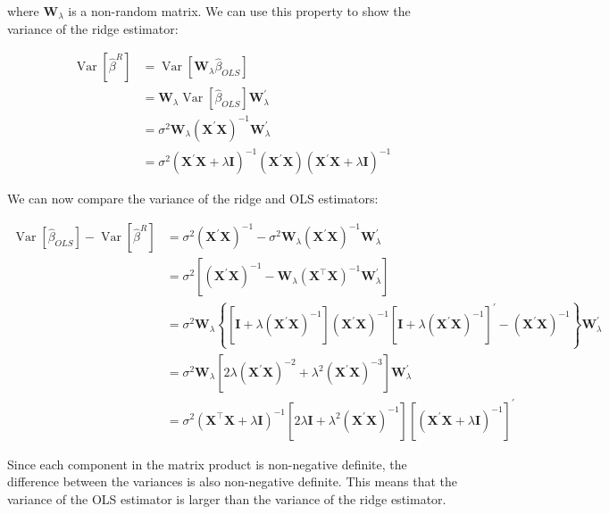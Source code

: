 \noindent where $\mathbf{W}_{\lambda}$ is a non-random matrix. We can use this property to show the variance of the ridge estimator:

\begin{align*}
\operatorname{Var}\left[\hat{\beta}^{R}\right]&=\operatorname{Var}\left[\mathbf{W}_\lambda\hat{\beta}_{OLS}\right]\\
&=\mathbf{W}_{\lambda}\operatorname{Var}\left[\hat{\beta}_{OLS}\right]\mathbf{W}_{\lambda}^{\prime}\\
&=\sigma^2 \mathbf{W}_\lambda (\mathbf{X}^{\prime} \mathbf{X})^{-1}\mathbf{W}_{\lambda}^{\prime}\\
&=\sigma^2\left(\mathbf{X}^{\prime} \mathbf{X}+\lambda \mathbf{I}\right)^{-1}(\mathbf{X}^{\prime} \mathbf{X})\left(\mathbf{X}^{\prime} \mathbf{X}+\lambda \mathbf{I}\right)^{-1}
\end{align*}

\noindent We can now compare the variance of the ridge and OLS estimators:

\begin{align*}
\operatorname{Var}[\hat{\beta}_{OLS}]-\operatorname{Var}[\hat{\beta}^{R}] &= \sigma^{2}(\mathbf{X}^{\prime} \mathbf{X})^{-1} - \sigma^2 \mathbf{W}_\lambda (\mathbf{X}^{\prime}\mathbf{X})^{-1}\mathbf{W}_{\lambda}^{\prime}\\
&=\sigma^{2}\left[\left(\mathbf{X}^{\prime} \mathbf{X}\right)^{-1}-\mathbf{W}_{\lambda}\left(\mathbf{X}^{\top} \mathbf{X}\right)^{-1} \mathbf{W}_{\lambda}^{\prime}\right] \\
&=\sigma^{2} \mathbf{W}_{\lambda}\left\{\left[\mathbf{I}+\lambda\left(\mathbf{X}^{\prime} \mathbf{X}\right)^{-1}\right]\left(\mathbf{X}^{\prime} \mathbf{X}\right)^{-1}\left[\mathbf{I}+\lambda\left(\mathbf{X}^{\prime} \mathbf{X}\right)^{-1}\right]^{\prime}-\left(\mathbf{X}^{\prime} \mathbf{X}\right)^{-1}\right\} \mathbf{W}_{\lambda}^{\prime} \\
&=\sigma^{2} \mathbf{W}_{\lambda}\left[2 \lambda\left(\mathbf{X}^{\prime} \mathbf{X}\right)^{-2}+\lambda^{2}\left(\mathbf{X}^{\prime} \mathbf{X}\right)^{-3}\right] \mathbf{W}_{\lambda}^{\prime} \\
&=\sigma^{2}\left(\mathbf{X}^{\top} \mathbf{X}+\lambda \mathbf{I}\right)^{-1}\left[2 \lambda \mathbf{I}+\lambda^{2}\left(\mathbf{X}^{\prime} \mathbf{X}\right)^{-1}\right]\left[\left(\mathbf{X}^{\prime} \mathbf{X}+\lambda \mathbf{I}\right)^{-1}\right]^{\prime}
\end{align*}

\noindent Since each component in the matrix product is non-negative definite, the difference between the variances is also non-negative definite. This means that the variance of the OLS estimator is larger than the variance of the ridge estimator.

